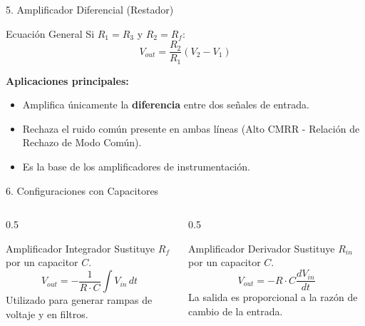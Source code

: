 \documentclass{beamer}
\begin{document}
\begin{frame}{5. Amplificador Diferencial (Restador)}
    \begin{block}{Ecuación General}
        Si $R_1 = R_3$ y $R_2 = R_f$:
        \[ V_{out} = \frac{R_2}{R_1} (V_2 - V_1) \]
    \end{block}
    \vspace{0.2cm}
    \textbf{Aplicaciones principales:}
    \begin{itemize}
        \item Amplifica únicamente la \textbf{diferencia} entre dos señales de entrada.
        \item Rechaza el ruido común presente en ambas líneas (Alto CMRR - Relación de Rechazo de Modo Común).
        \item Es la base de los amplificadores de instrumentación.
    \end{itemize}
\end{frame}

\begin{frame}{6. Configuraciones con Capacitores}
    \begin{columns}
        \begin{column}{0.5\textwidth}
            \begin{block}{Amplificador Integrador}
                Sustituye $R_f$ por un capacitor $C$.
                \[ V_{out} = -\frac{1}{R \cdot C} \int V_{in} \, dt \]
                Utilizado para generar rampas de voltaje y en filtros.
            \end{block}
        \end{column}
        \begin{column}{0.5\textwidth}
            \begin{block}{Amplificador Derivador}
                Sustituye $R_{in}$ por un capacitor $C$.
                \[ V_{out} = -R \cdot C \frac{dV_{in}}{dt} \]
                La salida es proporcional a la razón de cambio de la entrada.
            \end{block}
        \end{column}
    \end{columns}
\end{frame}
\end{document}
